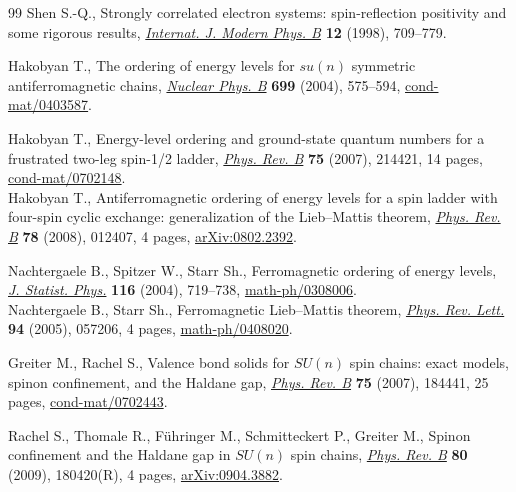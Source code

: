\documentclass[pdftex]{sigma}
\begin{document}
\begin{thebibliography}{99}
Shen S.-Q.,
Strongly correlated electron systems: spin-ref\/lection positivity and some rigorous results,
\href{http://dx.doi.org/10.1142/S0217979298000442}{{\it Internat. J. Modern Phys. B}} {\bf 12} (1998), 709--779.


Hakobyan T.,
The ordering of energy levels for $su(n)$ symmetric antiferromagnetic chains,
\href{http://dx.doi.org/10.1016/j.nuclphysb.2004.07.032}{{\it  Nuclear Phys. B}} {\bf 699} (2004), 575--594,
\href{http://arxiv.org/abs/cond-mat/0403587}{cond-mat/0403587}.


Hakobyan T.,
Energy-level ordering and ground-state quantum numbers for a frustrated two-leg spin-1/2 ladder,
\href{http://dx.doi.org/10.1103/PhysRevB.75.214421}{{\it Phys. Rev. B}}  {\bf 75} (2007), 214421, 14 pages,
\href{http://arxiv.org/abs/cond-mat/0702148}{cond-mat/0702148}. \\
Hakobyan T.,
Antiferromagnetic ordering of energy levels for a spin ladder with four-spin cyclic exchange: generalization of the Lieb--Mattis theorem,
\href{http://dx.doi.org/10.1103/PhysRevB.78.012407}{{\it Phys. Rev. B}} {\bf 78} (2008), 012407, 4 pages,
\href{http://arxiv.org/abs/0802.2392}{arXiv:0802.2392}.

Nachtergaele B., Spitzer W., Starr Sh.,
Ferromagnetic ordering of energy levels,
\href{http://dx.doi.org/10.1023/B:JOSS.0000037227.24460.e5}{{\it J. Statist. Phys.}} {\bf 116} (2004), 719--738,
\href{http://arxiv.org/abs/math-ph/0308006}{math-ph/0308006}.
\\
Nachtergaele B., Starr Sh.,
Ferromagnetic Lieb--Mattis theorem,
\href{http://dx.doi.org/10.1103/PhysRevLett.94.057206}{{\it Phys. Rev. Lett.}} {\bf 94} (2005), 057206, 4 pages,
\href{http://arxiv.org/abs/math-ph/0408020}{math-ph/0408020}.

 Greiter M., Rachel S.,
Valence bond solids for $SU(n)$ spin chains: exact models, spinon conf\/inement, and the Haldane gap,
\href{http://dx.doi.org/10.1103/PhysRevB.75.184441}{{\it Phys. Rev. B}} {\bf 75} (2007), 184441, 25 pages,
\href{http://arxiv.org/abs/cond-mat/0702443}{cond-mat/0702443}.

Rachel S., Thomale R., F\"uhringer M., Schmitteckert P., Greiter M.,
Spinon conf\/inement and the Haldane gap in $SU(n)$ spin chains,
\href{http://dx.doi.org/10.1103/PhysRevB.80.180420}{{\it Phys. Rev. B}} {\bf 80}  (2009), 180420(R), 4 pages,
\href{http://arxiv.org/abs/0904.3882}{arXiv:0904.3882}.


\end{thebibliography}
\end{document}
